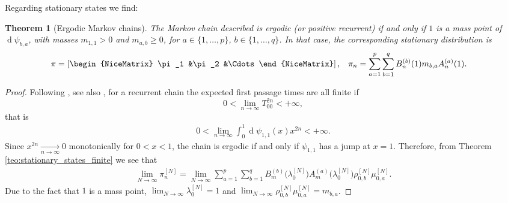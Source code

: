 \documentclass[11pt]{amsart}
\theoremstyle{plain}
\newtheorem{teo}{Theorem}[section]
\renewcommand{\d}{\operatorname{d}}
\newcommand{\1}{\text{\fontseries{bx}\selectfont \textup 1}}
\begin{document}
Regarding stationary states we find:
\begin{teo}[Ergodic Markov chains]
	The Markov chain described is ergodic (or positive recurrent) if and only if $1$ is a mass point of $\d\psi_{b,a}$, with masses $m_{1,1}>0$ and $m_{a,b}\geqslant 0$, for $a\in\{1,\dots,p\}$, $b\in\{1,\dots,q\}$. In that case, the corresponding stationary distribution is
	\[	\begin{aligned}
		\pi&=\left[\begin{NiceMatrix}
			\pi_1 &\pi_2 &\Cdots
		\end{NiceMatrix}\right], &
		\pi_{n}&=\sum_{a=1}^p\sum_{b=1}^q B_n^{(b)}(1)m_{b,a}A_n^{(a)}(1).
	\end{aligned}\]
\end{teo}
\begin{proof}
	
	Following \cite{KarlinMcGregor}, see also \cite{gallager}, for a recurrent chain the expected first passage times are all finite if
	\[
	0<\lim_{n\to\infty} T_{00}^{2n}<+\infty,
	\]
	that is
	\begin{align*}
		0<	\lim_{n\to\infty} \int_0^1\d\psi_{1,1} (x)x^{2n}<+\infty.
	\end{align*}
	Since $x^{2n}\xrightarrow[n\to\infty]{} 0$ monotonically for $0<x<1$, the chain is ergodic if and only if $\psi_{1,1}$ has a jump at $x=1$.
	Therefore, from Theorem \ref{teo:stationary_states_finite} we see that
	\begin{align*}
		\lim_{N\to\infty} \pi^{[N]}_{n}=		\lim_{N\to\infty}\sum_{a=1}^p\sum_{b=1}^q
		B_{m}^{(b)}\big(\lambda^{[N]}_0\big) A_{m}^{(a)}\big(\lambda^{[N]}_0\big)\rho^{[N]}_{0,b} \mu^{[N]}_{0,a}.
	\end{align*}
	Due to the fact that $1$ is a mass point, $\lim_{N\to\infty}\lambda^{[N]}_0=1$
	and $\lim_{N\to\infty} \rho^{[N]}_{0,b}\mu^{[N]}_{0,a}=m_{b,a}$.
\end{proof}
\end{document}
